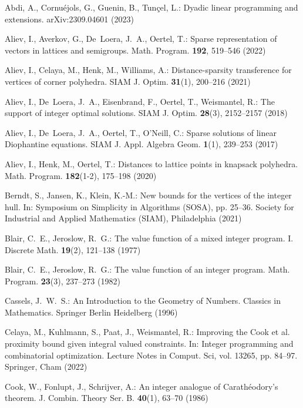 \documentclass[runningheads]{llncs}
\renewcommand\>{\rangle}
\newcommand\<{\langle}
\newcommand\0{\mathbf{0}}
\begin{document}
\begin{thebibliography}{99}


Abdi, A., Cornu\'ejols, G., Guenin, B., Tun\c cel, L.:
Dyadic linear programming and extensions.
arXiv:2309.04601 (2023)


Aliev, I., Averkov, G., De~Loera, J.~A., Oertel, T.:
Sparse representation of vectors in lattices and semigroups.
 Math. Program. \textbf{192}, 519--546 (2022)


Aliev, I., Celaya, M., Henk, M., Williams, A.:
Distance-sparsity transference for vertices of corner polyhedra.
SIAM J. Optim.  \textbf{31}(1), 200--216 (2021)


Aliev, I., De~Loera, J.~A., Eisenbrand, F., Oertel, T., Weismantel, R.:
The support of integer optimal solutions.
SIAM J. Optim.  \textbf{28}(3), 2152--2157 (2018)

Aliev, I., De~Loera, J.~A., Oertel, T., O'Neill, C.:
Sparse solutions of linear {D}iophantine equations.
SIAM J. Appl. Algebra Geom. \textbf{1}(1), 239--253 (2017)


Aliev, I., Henk, M., Oertel, T.:
Distances to lattice points in knapsack polyhedra.
Math. Program. \textbf{182}(1-2), 175--198 (2020)


Berndt, S., Jansen, K., Klein, K.-M.:
New bounds for the vertices of the integer hull. In: 
Symposium on Simplicity in Algorithms (SOSA),  pp. 25--36.
Society for Industrial and Applied Mathematics (SIAM), Philadelphia (2021)

Blair, C.~E., Jeroslow, R.~G.:
The value function of a mixed integer program. {I}.
Discrete Math. \textbf{19}(2), 121--138 (1977)


Blair, C.~E., Jeroslow, R.~G.:
The value function of an integer program.
Math. Program.   \textbf{23}(3), 237--273 (1982)


Cassels, J.~W.~S.:
An Introduction to the Geometry of Numbers.
Classics in Mathematics. Springer Berlin Heidelberg (1996)



Celaya, M.,  Kuhlmann, S., Paat, J., Weismantel, R.:
Improving the Cook et al. proximity bound given integral valued constraints.
In: Integer programming and combinatorial optimization. Lecture Notes in Comput. Sci, vol. 13265,  pp. 84–97.
Springer, Cham (2022)


Cook, W., Fonlupt, J., Schrijver, A.:
An integer analogue of {C}arath\'eodory's theorem.
J. Combin. Theory Ser. B. \textbf{40}(1), 63--70 (1986)


\end{thebibliography}
\end{document}
